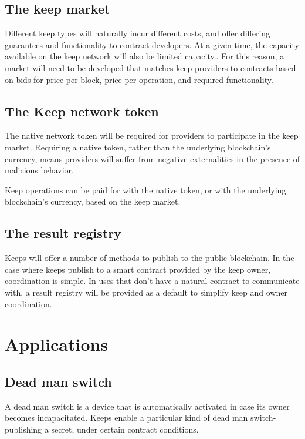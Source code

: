 \documentclass[11pt]{article}
\begin{document}
\subsection{The keep market}

Different keep types will naturally incur different costs, and offer
differing guarantees and functionality to contract developers. At a
given time, the capacity available on the keep network will also be
limited capacity.. For this reason, a market will need to be developed
that matches keep providers to contracts based on bids for price per
block, price per operation, and required functionality.

\subsection{The Keep network token}

The native network token will be required for providers to participate
in the keep market. Requiring a native token, rather than the
underlying blockchain's currency, means providers will suffer from
negative externalities in the presence of malicious behavior.

Keep operations can be paid for with the native token, or with the
underlying blockchain's currency, based on the keep market.

\subsection{The result registry}

Keeps will offer a number of methods to publish to the public
blockchain. In the case where keeps publish to a smart contract
provided by the keep owner, coordination is simple. In uses that don't
have a natural contract to communicate with, a result registry will be
provided as a default to simplify keep and owner coordination.

\section{Applications}

\subsection{Dead man switch}

A dead man switch is a device that is automatically activated in case
its owner becomes incapacitated. Keeps enable a particular kind of
dead man switch- publishing a secret, under certain contract
conditions.
\end{document}
